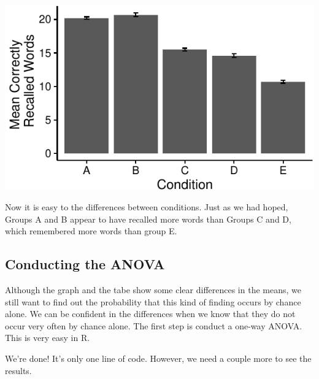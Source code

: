 \includegraphics{Lab4_files/figure-latex/unnamed-chunk-5-1}

Now it is easy to the differences between conditions. Just as we had
hoped, Groups A and B appear to have recalled more words than Groups C
and D, which remembered more words than group E.

\subsection{Conducting the ANOVA}\label{conducting-the-anova}

Although the graph and the tabe show some clear differences in the
means, we still want to find out the probability that this kind of
finding occurs by chance alone. We can be confident in the differences
when we know that they do not occur very often by chance alone. The
first step is conduct a one-way ANOVA. This is very easy in R.

\begin{Shaded}
\begin{Highlighting}[]
\end{Highlighting}
\end{Shaded}

We're done! It's only one line of code. However, we need a couple more
to see the results.

\begin{Shaded}
\begin{Highlighting}[]
\NormalTok{(}\NormalTok{)}
\end{Highlighting}
\end{Shaded}

